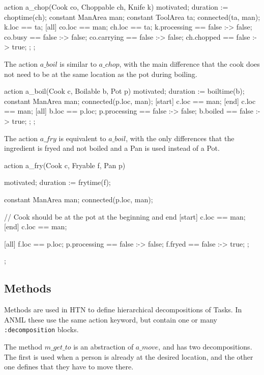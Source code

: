 \begin{anmlcode}
action a_chop(Cook co, Choppable ch, Knife k) {
  motivated;
  duration := choptime(ch);
  constant ManArea man;
  constant ToolArea ta;
  connected(ta, man);
  k.loc == ta;
  [all] {
    co.loc == man;
    ch.loc == ta;
    k.processing == false :-> false;
    co.busy == false :-> false;
    co.carrying == false :-> false;
    ch.chopped == false :-> true;
  };
};
\end{anmlcode}

The action $a\_boil$ is similar to $a\_chop$, with the main difference that the cook does not need to be at the same location as the pot during boiling.

\begin{anmlcode}
action a_boil(Cook c, Boilable b, Pot p) {
  motivated;
  duration := boiltime(b);
  constant ManArea man;
  connected(p.loc, man);
  [start] c.loc == man;
  [end] c.loc == man;
  [all] {
    b.loc == p.loc;
    p.processing == false :-> false;
    b.boiled == false :-> true;
  };
};
\end{anmlcode}

The action $a\_fry$ is equivalent to $a\_boil$, with the only differences that the ingredient is fryed and not boiled and a Pan is used instead of a Pot.

\begin{anmlcode}
action a_fry(Cook c, Fryable f, Pan p) {
  motivated;
  duration := frytime(f);

  constant ManArea man;
  connected(p.loc, man);

  // Cook should be at the pot at the beginning and end
  [start] c.loc == man;
  [end] c.loc == man;

  [all] {
    f.loc == p.loc;
    p.processing == false :-> false;
    f.fryed == false :-> true;
  };
};
\end{anmlcode}

\subsection{Methods}

Methods are used in \ac{HTN} to define hierarchical decompositions of Tasks.
In \ac{ANML} these use the same action keyword, but contain one or many \verb|:decomposition| blocks.

The method $m\_get\_to$ is an abstraction of $a\_move$, and has two decompositions.
The first is used when a person is already at the desired location, and the other one defines that they have to move there.

